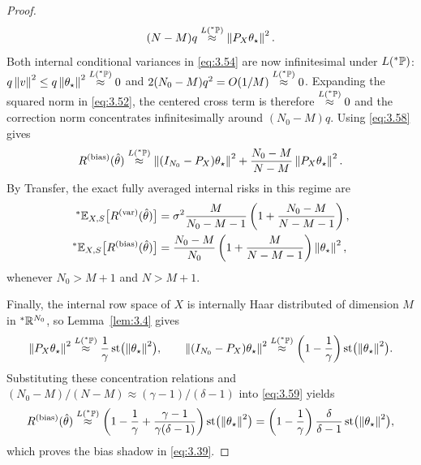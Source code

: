 \begin{proof}
\begin{equation}\label{eq:3.58}
(N - M)q \stackrel{L({}^*\mathbb{P})}{\approx} \left\lVert P_X\theta_\star \right\rVert^2.
\end{equation}
Both internal conditional variances in \eqref{eq:3.54} are now infinitesimal under $L({}^*\mathbb{P})$: $q\left\lVert v \right\rVert^2 \le q\left\lVert \theta_\star \right\rVert^2 \stackrel{L({}^*\mathbb{P})}{\approx} 0$ and $2(N_0 - M)q^2 = O(1/M) \stackrel{L({}^*\mathbb{P})}{\approx} 0$. Expanding the squared norm in \eqref{eq:3.52}, the centered cross term is therefore $\stackrel{L({}^*\mathbb{P})}{\approx} 0$ and the correction norm concentrates infinitesimally around $(N_0 - M)q$. Using \eqref{eq:3.58} gives
\begin{equation}\label{eq:3.59}
R^{(\mathrm{bias})}(\hat{\theta}) \stackrel{L({}^*\mathbb{P})}{\approx} \left\lVert (I_{N_0} - P_X)\theta_\star \right\rVert^2 + \frac{N_0 - M}{N - M}\left\lVert P_X\theta_\star \right\rVert^2.
\end{equation}
By Transfer, the exact fully averaged internal risks in this regime are
\begin{equation}\label{eq:3.60}
\begin{aligned}
{}^*\mathbb{E}_{X, S}\bigl[R^{(\mathrm{var})}(\hat{\theta})\bigr] &= \sigma^2 \frac{M}{N_0 - M - 1}\left(1 + \frac{N_0 - M}{N - M - 1}\right), \\
{}^*\mathbb{E}_{X, S}\bigl[R^{(\mathrm{bias})}(\hat{\theta})\bigr] &= \frac{N_0 - M}{N_0}\left(1 + \frac{M}{N - M - 1}\right)\left\lVert \theta_\star \right\rVert^2,
\end{aligned}
\end{equation}
whenever $N_0 > M + 1$ and $N > M + 1$.

Finally, the internal row space of $X$ is internally Haar distributed of dimension $M$ in ${}^*\mathbb{R}^{N_0}$, so Lemma~\ref{lem:3.4} gives
\begin{equation}\label{eq:3.61}
\left\lVert P_X\theta_\star \right\rVert^2 \stackrel{L({}^*\mathbb{P})}{\approx} \frac{1}{\gamma}\operatorname{st}\bigl(\left\lVert \theta_\star \right\rVert^2\bigr), \qquad \left\lVert (I_{N_0} - P_X)\theta_\star \right\rVert^2 \stackrel{L({}^*\mathbb{P})}{\approx} \left(1 - \frac{1}{\gamma}\right)\operatorname{st}\bigl(\left\lVert \theta_\star \right\rVert^2\bigr).
\end{equation}
Substituting these concentration relations and $(N_0 - M) / (N - M) \approx (\gamma - 1) / (\delta - 1)$ into \eqref{eq:3.59} yields
\begin{equation}\label{eq:3.62}
R^{(\mathrm{bias})}(\hat{\theta}) \stackrel{L({}^*\mathbb{P})}{\approx} \left(1 - \frac{1}{\gamma} + \frac{\gamma - 1}{\gamma(\delta - 1)}\right)\operatorname{st}\bigl(\left\lVert \theta_\star \right\rVert^2\bigr) = \left(1 - \frac{1}{\gamma}\right)\frac{\delta}{\delta - 1}\operatorname{st}\bigl(\left\lVert \theta_\star \right\rVert^2\bigr),
\end{equation}
which proves the bias shadow in \eqref{eq:3.39}.
\end{proof}

